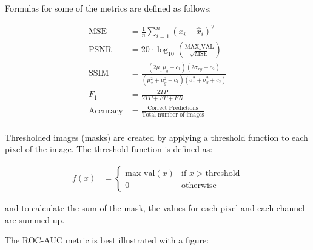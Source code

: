 Formulas for some of the metrics are defined as follows:

\begin{align*}
    \text{MSE} &= \frac{1}{n} \sum_{i=1}^{n} (x_i - \hat{x}_i)^2 \\
    \text{PSNR} &= 20 \cdot \log_{10} \left( \frac{\text{MAX\_VAL}}{\sqrt{\text{MSE}}} \right) \\
    \text{SSIM} &= \frac{(2\mu_x\mu_y + c_1)(2\sigma_{xy} + c_2)}{(\mu_x^2 + \mu_y^2 + c_1)(\sigma_x^2 + \sigma_y^2 + c_2)} \\
    F_1 &= \frac{2TP}{2TP + FP + FN} \\
    \text{Accuracy} &= \frac{\text{Correct Predictions}}{\text{Total number of images}} \\
\end{align*}

Thresholded images (masks) are created by applying a threshold function to each pixel of the image. The threshold function is defined as:

\begin{align*}
    f(x) &= 
    \begin{cases}
        \text{max\_val}(x) & \text{if } x > \text{threshold} \\
        0 & \text{otherwise}
    \end{cases} 
\end{align*}

and to calculate the sum of the mask, the values for each pixel and each channel are summed up.
\par
The ROC-AUC metric is best illustrated with a figure:
